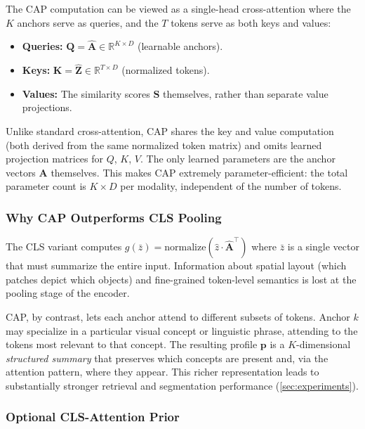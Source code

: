 The CAP computation can be viewed as a single-head cross-attention where the $K$ anchors serve as queries, and the $T$ tokens serve as both keys and values:
\begin{itemize}[leftmargin=*,nosep]
    \item \textbf{Queries:} $\mathbf{Q} = \hat{\mathbf{A}} \in \mathbb{R}^{K \times D}$ (learnable anchors).
    \item \textbf{Keys:} $\mathbf{K} = \hat{\mathbf{Z}} \in \mathbb{R}^{T \times D}$ (normalized tokens).
    \item \textbf{Values:} The similarity scores $\mathbf{S}$ themselves, rather than separate value projections.
\end{itemize}
Unlike standard cross-attention, CAP shares the key and value computation (both derived from the same normalized token matrix) and omits learned projection matrices for $Q$, $K$, $V$.  The only learned parameters are the anchor vectors $\mathbf{A}$ themselves.  This makes CAP extremely parameter-efficient: the total parameter count is $K \times D$ per modality, independent of the number of tokens.

\subsubsection{Why CAP Outperforms CLS Pooling}

The CLS variant computes $g(\bar{z}) = \mathrm{normalize}(\hat{z} \cdot \hat{\mathbf{A}}^\top)$ where $\bar{z}$ is a single vector that must summarize the entire input.  Information about spatial layout (which patches depict which objects) and fine-grained token-level semantics is lost at the pooling stage of the encoder.

CAP, by contrast, lets each anchor attend to different subsets of tokens.  Anchor $k$ may specialize in a particular visual concept or linguistic phrase, attending to the tokens most relevant to that concept.  The resulting profile $\mathbf{p}$ is a $K$-dimensional \emph{structured summary} that preserves which concepts are present and, via the attention pattern, where they appear.  This richer representation leads to substantially stronger retrieval and segmentation performance (\cref{sec:experiments}).

\subsubsection{Optional CLS-Attention Prior}

